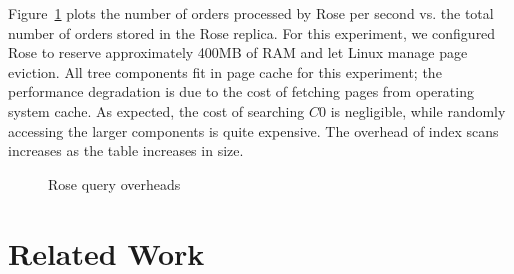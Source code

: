 \documentclass{vldb}
\newcommand{\rows}{Rose\xspace}
\newcommand{\rowss}{Rose's\xspace}
\begin{document}
Figure~\ref{fig:tpch} plots the number of orders processed by \rows
per second vs. the total number of orders stored in the \rows replica.
For this experiment, we configured \rows to reserve approximately
400MB of RAM and let Linux manage page eviction.  All tree components
fit in page cache for this experiment; the performance degradation is
due to the cost of fetching pages from operating system cache.
As expected, the cost of searching $C0$ is negligible,
while randomly accessing the larger components is quite expensive.
The overhead of index scans increases as the table increases in size.

\begin{figure}
\centering {}
\caption{\rows query overheads}
\label{fig:tpch}
\end{figure}




\section{Related Work}
\end{document}
